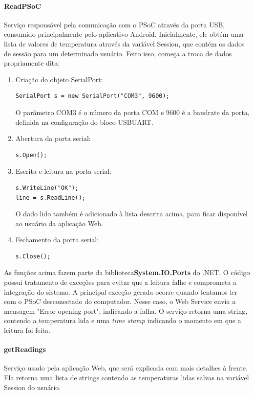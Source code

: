 \documentclass[a4paper,12pt,titlepage]{article}
\begin{document}
			\paragraph{ReadPSoC}
				Serviço responsável pela comunicação com o PSoC através da porta USB, consumido principalmente pelo aplicativo Android. Inicialmente, ele obtém uma lista de valores de temperatura através da variável Session, que contém os dados de sessão para um determinado usuário. Feito isso, começa a troca de dados propriamente dita:
				\begin{enumerate}
					\item Criação do objeto SerialPort:
								\begin{lstlisting}	
SerialPort s = new SerialPort("COM3", 9600);
								\end{lstlisting}
						  O parâmetro COM3 é o número da porta COM e 9600 é a baudrate da porta, definida na configuração do bloco USBUART.
					\item Abertura da porta serial:
								\begin{lstlisting}	
s.Open();
								\end{lstlisting}
					\item Escrita e leitura na porta serial:
								\begin{lstlisting}	
s.WriteLine("OK");
line = s.ReadLine();								
								\end{lstlisting}
							O dado lido também é adicionado à lista descrita acima, para ficar disponível ao usuário da aplicação Web.
					\item Fechamento da porta serial:
								\begin{lstlisting}	
s.Close();
								\end{lstlisting}
																  
				\end{enumerate}
			As funções acima fazem parte da biblioteca\textbf{System.IO.Ports} do .NET.
			O código possui tratamento de exceções para evitar que a leitura falhe e comprometa a integração do sistema. A principal exceção gerada ocorre quando tentamos ler com o PSoC desconectado do computador. Nesse caso, o Web Service envia a mensagem "Error opening port", indicando a falha. 
			O serviço retorna uma string, contendo a temperatura lida e uma \textit{time stamp} indicando o momento em que a leitura foi feita.
		
			\paragraph{getReadings}
				Serviço usado pela aplicação Web, que será explicada com mais detalhes à frente. Ela retorna uma lista de strings contendo as temperaturas lidas salvas na variável Session do usuário. 
				
\end{document}
